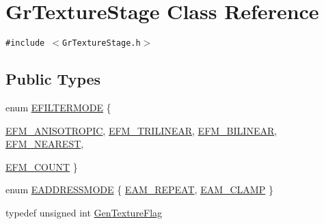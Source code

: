 \hypertarget{class_gr_texture_stage}{
\section{GrTextureStage Class Reference}
\label{class_gr_texture_stage}
}
{\tt \#include $<$GrTextureStage.h$>$}

\subsection*{Public Types}
\begin{CompactItemize}
\item 
enum \hyperlink{class_gr_texture_stage_b86144a2e97311bb975db7c2c361f048}{EFILTERMODE} \{ \par
\hyperlink{class_gr_texture_stage_b86144a2e97311bb975db7c2c361f048097400c6cb008ee2154a0b369d6d8fe0}{EFM\_\-ANISOTROPIC}, 
\hyperlink{class_gr_texture_stage_b86144a2e97311bb975db7c2c361f0482208e78123e0ffc8170576e9dbf9ceb1}{EFM\_\-TRILINEAR}, 
\hyperlink{class_gr_texture_stage_b86144a2e97311bb975db7c2c361f048501ac6f236392708f83174094dfa9f7b}{EFM\_\-BILINEAR}, 
\hyperlink{class_gr_texture_stage_b86144a2e97311bb975db7c2c361f048582052f16383ad9a61b663a0b8782208}{EFM\_\-NEAREST}, 
\par
\hyperlink{class_gr_texture_stage_b86144a2e97311bb975db7c2c361f04870914660843541078f1353358799457e}{EFM\_\-COUNT}
 \}
\item 
enum \hyperlink{class_gr_texture_stage_dea63364bc3369d0cf5ef74b76268d0e}{EADDRESSMODE} \{ \hyperlink{class_gr_texture_stage_dea63364bc3369d0cf5ef74b76268d0e74df555bc49f7e73a5892485ae1e8cc7}{EAM\_\-REPEAT}, 
\hyperlink{class_gr_texture_stage_dea63364bc3369d0cf5ef74b76268d0e59142b13ea84cd62f7609132ada3b380}{EAM\_\-CLAMP}
 \}
\item 
typedef unsigned int \hyperlink{class_gr_texture_stage_60f59a039bf1c95b76659752ff1bf7d6}{GenTextureFlag}

\end{CompactItemize}
